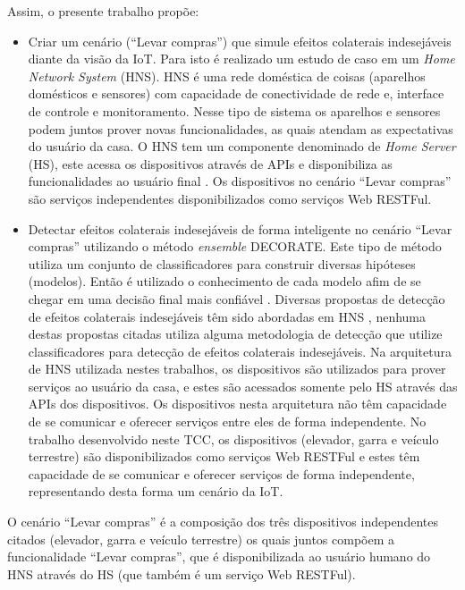 Assim, o presente trabalho propõe:
\begin{itemize}
\item Criar um cenário (``Levar compras'') que simule efeitos colaterais indesejáveis diante da visão da IoT. Para isto é realizado um estudo de caso em um \textit{Home Network System} (HNS). HNS é uma rede doméstica de coisas (aparelhos domésticos e sensores) com capacidade de conectividade de rede e, interface de controle e monitoramento. Nesse tipo de sistema os aparelhos e sensores podem juntos prover novas funcionalidades, as quais atendam as expectativas do usuário da casa. O HNS tem um componente denominado de \textit{Home Server} (HS), este acessa os dispositivos através de APIs e disponibiliza as funcionalidades ao usuário final \cite{Nakamura:2009, Ikegami:2013}. Os dispositivos no cenário ``Levar compras'' são serviços independentes disponibilizados como serviços Web RESTFul.
\item Detectar efeitos colaterais indesejáveis de forma inteligente no cenário ``Levar compras'' utilizando o método \textit{ensemble} DECORATE. Este tipo de método utiliza um conjunto de classificadores para construir diversas hipóteses (modelos). Então é utilizado o conhecimento de cada modelo afim de se chegar em uma decisão final mais confiável \cite{Melville:2004}. Diversas propostas de detecção de efeitos colaterais indesejáveis têm sido abordadas em HNS \cite{Wilson:2008, Nakamura:2009, Ikegami:2013, Maternaghan:2013, Alfakeeh:2016}, nenhuma destas propostas citadas utiliza alguma metodologia de detecção que utilize classificadores para detecção de efeitos colaterais indesejáveis. Na arquitetura de HNS utilizada nestes trabalhos, os dispositivos são utilizados para prover serviços ao usuário da casa, e estes são acessados somente pelo HS através das APIs dos dispositivos. Os dispositivos nesta arquitetura não têm capacidade de se comunicar e oferecer serviços entre eles de forma independente. No trabalho desenvolvido neste TCC, os dispositivos (elevador, garra e veículo terrestre) são disponibilizados como serviços Web RESTFul e estes têm capacidade de se comunicar e oferecer serviços de forma independente, representando desta forma um cenário da IoT.
\end{itemize}

O cenário ``Levar compras'' é a composição dos três dispositivos independentes citados (elevador, garra e veículo terrestre) os quais juntos compõem a funcionalidade ``Levar compras'', que é disponibilizada ao usuário humano do HNS através do HS (que também é um serviço Web RESTFul).

